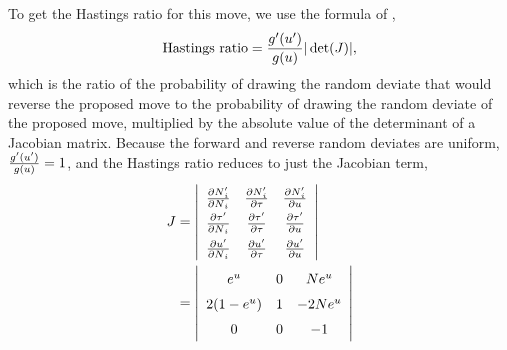 \begin{linenomath}
To get the Hastings ratio for this move, we use the formula of
\citet{Green1995},
\begin{equation}
    \textrm{Hastings ratio} =
    \frac{g^{\prime}(u^{\prime})}{g(u)} |\det(J)|,
    \label{eq:greenhastings}
\end{equation}
which is the ratio of the probability of drawing the random deviate that
would reverse the proposed move to the probability of drawing the random
deviate of the proposed move, multiplied by the absolute value of the
determinant of a Jacobian matrix.
Because the forward and reverse random deviates are uniform,
$\frac{g^{\prime}(u^{\prime})}{g(u)} = 1$,
and the Hastings ratio reduces to just the Jacobian term,
\begin{equation}
\ifdoublespacing{}{
\def\arraystretch{1.5}
}
\begin{split}
    J & = \left|\begin{array}{ccc}
        \frac{\partial \sepopsize[\rootpopindex]{}_i\proposed}{\partial \sepopsize[\rootpopindex]{}_i} &
        \frac{\partial \sepopsize[\rootpopindex]{}_i\proposed}{\partial \divtime} &
        \frac{\partial \sepopsize[\rootpopindex]{}_i\proposed}{\partial \uniformdeviate} \\
        \frac{\partial \divtime\proposed}{\partial \sepopsize[\rootpopindex]{}_i} &
        \frac{\partial \divtime\proposed}{\partial \divtime} &
        \frac{\partial \divtime\proposed}{\partial \uniformdeviate} \\
        \frac{\partial \uniformdeviate\proposed}{\partial \sepopsize[\rootpopindex]{}_i} &
        \frac{\partial \uniformdeviate\proposed}{\partial \divtime} &
        \frac{\partial \uniformdeviate\proposed}{\partial \uniformdeviate}
    \end{array}\right| \\
    & = \left|\begin{array}{ccc}
        e^{\uniformdeviate} &
        0 &
        \sepopsize[\rootpopindex]e^{\uniformdeviate} \\
        2(1 - e^{\uniformdeviate}) &
        1 &
        -2\sepopsize[\rootpopindex]e^{\uniformdeviate} \\
        0 &
        0 &
        -1
    \end{array}\right| \\

\end{split}
\end{equation}
\end{linenomath}
